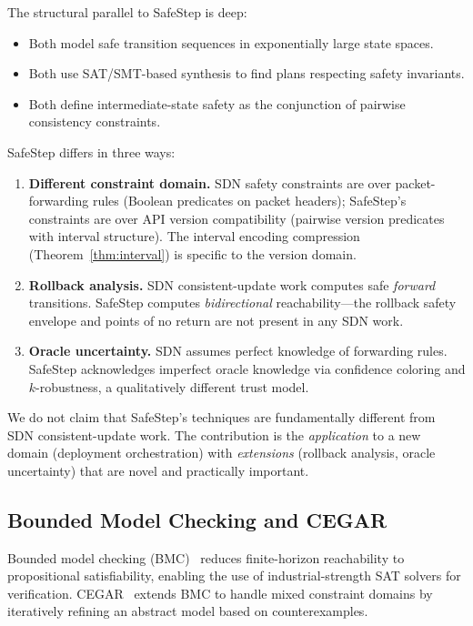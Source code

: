 \documentclass[10pt,twocolumn]{article}
\begin{document}
The structural parallel to SafeStep is deep:
\begin{itemize}
\item Both model safe transition sequences in exponentially large state spaces.
\item Both use SAT/SMT-based synthesis to find plans respecting safety invariants.
\item Both define intermediate-state safety as the conjunction of pairwise consistency constraints.
\end{itemize}

SafeStep differs in three ways:
\begin{enumerate}
\item \textbf{Different constraint domain.} SDN safety constraints are over packet-forwarding rules (Boolean predicates on packet headers); SafeStep's constraints are over API version compatibility (pairwise version predicates with interval structure). The interval encoding compression (Theorem~\ref{thm:interval}) is specific to the version domain.
\item \textbf{Rollback analysis.} SDN consistent-update work computes safe \emph{forward} transitions. SafeStep computes \emph{bidirectional} reachability---the rollback safety envelope and points of no return are not present in any SDN work.
\item \textbf{Oracle uncertainty.} SDN assumes perfect knowledge of forwarding rules. SafeStep acknowledges imperfect oracle knowledge via confidence coloring and $k$-robustness, a qualitatively different trust model.
\end{enumerate}

We do not claim that SafeStep's techniques are fundamentally different from SDN consistent-update work. The contribution is the \emph{application} to a new domain (deployment orchestration) with \emph{extensions} (rollback analysis, oracle uncertainty) that are novel and practically important.

\subsection{Bounded Model Checking and CEGAR}
\label{sec:related-bmc}

Bounded model checking (BMC)~\cite{clarke2001bmc} reduces finite-horizon reachability to propositional satisfiability, enabling the use of industrial-strength SAT solvers for verification. CEGAR~\cite{clarke2003cegar} extends BMC to handle mixed constraint domains by iteratively refining an abstract model based on counterexamples.
\end{document}
